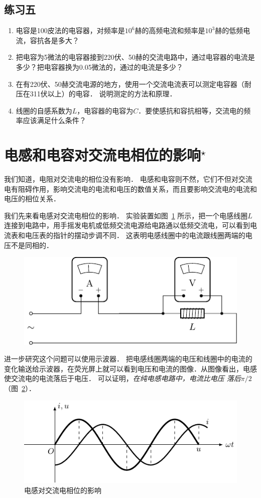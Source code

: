 \subsection*{练习五}
\begin{enumerate}
    \item 电容是100皮法的电容器，对频率是$10^6$赫的高频电流和频率是$10^3$赫的低频电流，容抗各是多大？
    \item 把电容为5微法的电容器接到220伏、50赫的交流电路中，通过电容器的电流是多少？把电容器换为0.05微法的，通过的电流是多少？
    \item 在有220伏、50赫交流电源的地方，使用一个交流电流表可以测定电容器（耐压在311伏以上）的电容．
    说明测定的方法和原理．
    \item 线圈的自感系数为$L$，电容器的电容为$C$．要使感抗和容抗相等，交流电的频率应该满足什么条件？
\end{enumerate}

\section{电感和电容对交流电相位的影响$^\star$}
我们知道，电阻对交流电的相位没有影响．
电感和电容则不然，它们不但对交流电有阻碍作用，影响交流电的电流和电压的数值关系，而且要影响交流电的电流和电压的相位关系．

我们先来看电感对交流电相位的影响．
实验装置如图~\ref{fig_C_3-20} 所示，把一个电感线圈$L$连接到电路中，用手摇发电机或低频交流电源给电路通以低频交流电，可以看到电流表和电压表的指针的摆动步调不同．
这表明电感线圈中的电流跟线圈两端的电压不是同相的．
\begin{figure}[htbp]
    \centering
    \includegraphics{fig/C/3-20.pdf}
    \caption{}\label{fig_C_3-20}
\end{figure}

进一步研究这个问题可以使用示波器．
把电感线圈两端的电压和线圈中的电流的变化输送给示波器，在荧光屏上就可以看到电压和电流的图像．从图像看出，电感使交流电的电流落后于电压．
可以证明，\textit{在纯电感电路中，电流比电压
落后$\pi/2$}（图~\ref{fig_C_3-21}）．
\begin{figure}[htbp]
    \centering
    \includegraphics{fig/C/3-21.pdf}
    \caption{电感对交流电相位的影响}\label{fig_C_3-21}
\end{figure}

